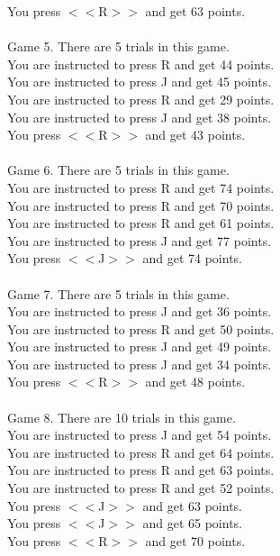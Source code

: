 \documentclass[pdflatex,sn-nature]{sn-jnl}%
\theoremstyle{thmstyleone}%
\theoremstyle{thmstyletwo}%
\theoremstyle{thmstylethree}%
\begin{document}
You press $<<$R$>>$ and get 63 points. $~$\\ 
 $~$\\ 
Game 5. There are 5 trials in this game. $~$\\ 
You are instructed to press R and get 44 points. $~$\\ 
You are instructed to press J and get 45 points. $~$\\ 
You are instructed to press R and get 29 points. $~$\\ 
You are instructed to press J and get 38 points. $~$\\ 
You press $<<$R$>>$ and get 43 points. $~$\\ 
 $~$\\ 
Game 6. There are 5 trials in this game. $~$\\ 
You are instructed to press R and get 74 points. $~$\\ 
You are instructed to press R and get 70 points. $~$\\ 
You are instructed to press R and get 61 points. $~$\\ 
You are instructed to press J and get 77 points. $~$\\ 
You press $<<$J$>>$ and get 74 points. $~$\\ 
 $~$\\ 
Game 7. There are 5 trials in this game. $~$\\ 
You are instructed to press J and get 36 points. $~$\\ 
You are instructed to press R and get 50 points. $~$\\ 
You are instructed to press J and get 49 points. $~$\\ 
You are instructed to press J and get 34 points. $~$\\ 
You press $<<$R$>>$ and get 48 points. $~$\\ 
 $~$\\ 
Game 8. There are 10 trials in this game. $~$\\ 
You are instructed to press J and get 54 points. $~$\\ 
You are instructed to press R and get 64 points. $~$\\ 
You are instructed to press R and get 63 points. $~$\\ 
You are instructed to press R and get 52 points. $~$\\ 
You press $<<$J$>>$ and get 63 points. $~$\\ 
You press $<<$J$>>$ and get 65 points. $~$\\ 
You press $<<$R$>>$ and get 70 points. $~$\\ 
\end{document}
